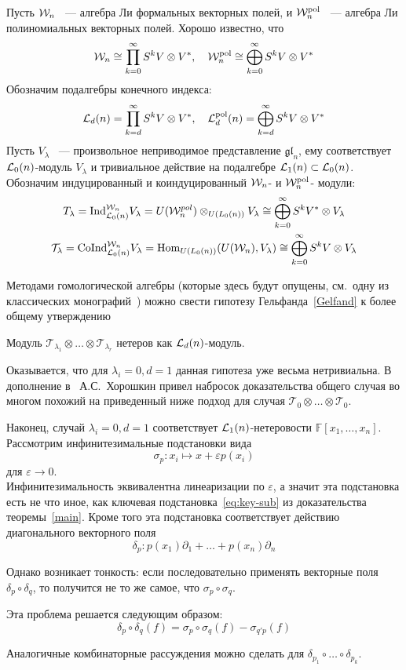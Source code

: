 Пусть $\mathcal{W}_n$ ~--- алгебра Ли формальных векторных полей, и $\mathcal{W}^{\mathrm{pol}}_n$ ~--- алгебра Ли полиномиальных векторных полей.
Хорошо известно, что
\[
    \mathcal{W}_n \cong \prod\limits_{k=0}^{\infty} S^k V\otimes V^*, \quad \mathcal{W}^{\mathrm{pol}}_n \cong \bigoplus\limits_{k=0}^{\infty} S^k V\otimes V^*
\]
Обозначим подалгебры конечного индекса:
\[
    \mathcal{L}_d(n) = \prod\limits_{k=d}^{\infty} S^k V\otimes V^*, \quad \mathcal{L}^{\mathrm{pol}}_d(n) = \bigoplus\limits_{k=d}^{\infty} S^k V\otimes V^*
\]
Пусть $V_{\lambda}$ ~--- произвольное неприводимое представление $\mathfrak{gl}_n$, ему соответствует $\mathcal{L}_0(n)$-модуль $V_{\lambda}$ и тривиальное действие на подалгебре $\mathcal{L}_1(n)\subset\mathcal{L}_0(n)$.
Обозначим индуцированный и коиндуцированный $\mathcal{W}_n$- и $\mathcal{W}^{\mathrm{pol}}_n$- модули:
\begin{gather*}
    T_{\lambda} = \mathrm{Ind}^{\mathcal{W}_n}_{\mathcal{L}_0(n)} V_{\lambda} = U(\mathcal{W}_n^{pol}) \otimes_{U(L_0(n))} V_{\lambda} \cong \bigoplus_{k=0}^{\infty} S^k V^*\otimes V_{\lambda} \\
    \mathcal{T}_{\lambda} = \mathrm{CoInd}^{\mathcal{W}_n}_{\mathcal{L}_0(n)} V_{\lambda} = \operatorname{Hom}_{U(L_0(n))}(U(\mathcal{W}_n), V_{\lambda}) \cong \bigoplus_{k=0}^{\infty} S^k V\otimes V_{\lambda}
\end{gather*}

Методами гомологической алгебры (которые здесь будут опущены, см.\ одну из классических монографий~\cite{Fuks}) можно свести гипотезу Гельфанда~\ref{Gelfand} к более общему утверждению

\vskip 0.1in\noindent
\begin{conjecture}
    Модуль $\mathcal{T}_{\lambda_1}\otimes\ldots\otimes\mathcal{T}_{\lambda_r}$ нетеров как $\mathcal{L}_d(n)$-модуль.
\end{conjecture}
\vskip 0.1in\noindent
\vskip 1.5in
Оказывается, что для $\lambda_i=0, d=1$ данная гипотеза уже весьма нетривиальна.
В дополнение в~\cite{Feigin-Kanel-Khoroshkin} А.С.\ Хорошкин привел набросок доказательства общего случая во многом похожий на приведенный ниже подход для случая $\mathcal{T}_{0}\otimes\ldots\otimes\mathcal{T}_{0}$.

Наконец, случай $\lambda_i=0, d=1$ соответствует $\mathcal{L}_1(n)$-нетеровости $\mathbb{F}[x_1, \ldots, x_n]$.
Рассмотрим инфинитезимальные подстановки вида
\[
    \sigma_p: x_i \mapsto x + \varepsilon p(x_i)
\]
для $\varepsilon\to 0$.\\
Инфинитезимальность эквивалентна линеаризации по $\varepsilon$, а значит эта подстановка есть не что иное, как ключевая подстановка~\ref{eq:key-sub} из доказательства теоремы~\ref{main}.
Кроме того эта подстановка соответствует действию диагонального векторного поля
\[
    \delta_p: p(x_1)\partial_1 + \ldots + p(x_n)\partial_n
\]

Однако возникает тонкость: если последовательно применять векторные поля $\delta_p \circ \delta_q$,
то получится не то же самое, что $\sigma_p \circ \sigma_q$.

Эта проблема решается следующим образом:
\[
    \delta_p \circ \delta_q (f) = \sigma_p \circ \sigma_q(f) - \sigma_{q'p} (f)
\]

Аналогичные комбинаторные рассуждения можно сделать для $\delta_{p_1}\circ\ldots\circ\delta_{p_k}$.